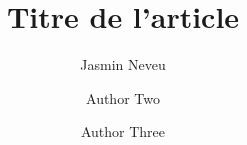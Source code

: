 \title{Titre de l'article}

\author[1,2]{Jasmin Neveu}
\author[2]{Author Two}
\author[3]{Author Three}


\date{}

\newcommand{\emails}{
\texttt{jasmin.neveu@email.com, author2@email.com, author3@email.com}
}

